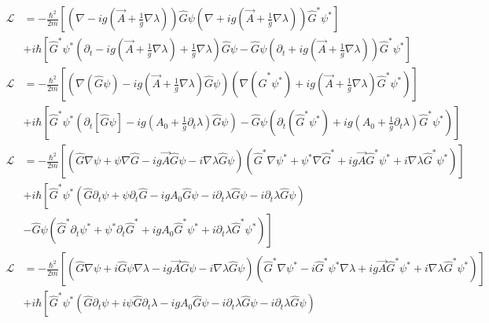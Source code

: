 \begin{align*}
    \mathcal{L}&= -\frac{\hbar^2}{2m}\left[ \left(\nabla - ig\left(\vec{A}+ \frac{1}{g} \nabla \lambda \right)\right)\hat{G}\psi \left( \nabla + ig\left(\vec{A}+ \frac{1}{g} \nabla \lambda \right)\right)\hat{G}^* \psi^*\right] \\
    &+ i\hbar \left[\hat{G}^* \psi^* \left(\partial_t -ig\left(\vec{A}+ \frac{1}{g} \nabla \lambda \right)+ \frac{1}{g} \nabla \lambda\right) \hat{G}\psi - \hat{G}\psi \left(\partial_t +ig\left(\vec{A}+ \frac{1}{g} \nabla \lambda \right)\right) \hat{G}^* \psi^*\right]\\
    \mathcal{L}&= - \frac{\hbar^2}{2m}\left[\left(\nabla \left(\hat{G}\psi\right)-ig \left(\vec{A}+\frac{1}{g}\nabla \lambda \right)\hat{G}\psi \right)\left(\nabla \left(\hat{G}^*\psi^*\right)+ig \left(\vec{A}+\frac{1}{g}\nabla\lambda\right)\hat{G}^*\psi^*\right) \right]\\
    & +i \hbar \left[\hat{G}^* \psi^* \left(\partial_t \left[\hat{G}\psi\right]-ig\left(A_0+\frac{1}{g}\partial_t \lambda\right)\hat{G}\psi \right)- \hat{G}\psi \left(\partial_t \left(\hat{G}^* \psi^* \right)+ig \left(A_0 + \frac{1}{g}\partial_t \lambda\right)\hat{G}^*\psi^*\right) \right]\\
    \mathcal{L}&= -\frac{\hbar^2}{2m} \left[\left(\hat{G}\nabla \psi + \psi \nabla \hat{G}- ig\vec{A}\hat{G}\psi - i \nabla \lambda \hat{G}\psi\right)\left(\hat{G}^*\nabla\psi^* + \psi^* \nabla\hat{G}^* + ig \vec{A}\hat{G}^*\psi^* + i\nabla \lambda \hat{G}^*  \psi^* \right) \right]\\
    &+ i\hbar \left[\hat{G}^* \psi^* \left(\hat{G}\partial_t \psi +\psi \partial_t \hat{G}-igA_0\hat{G}\psi-i\partial_t \lambda \hat{G}\psi -i \partial_t \lambda \hat{G}\psi \right)\right.\\ 
    &\left. -\hat{G}\psi \left(\hat{G}^* \partial_t \psi^* + \psi^* \partial_t \hat{G}^*+ igA_0 \hat{G}^* \psi^* +i\partial_t \lambda \hat{G}^* \psi^*  \right) \right]\\
    \mathcal{L}&= -\frac{\hbar^2}{2m} \left[\left(\hat{G}\nabla \psi + i\hat{G}\psi \nabla \lambda - ig\vec{A}\hat{G}\psi - i \nabla \lambda \hat{G}\psi\right)\left(\hat{G}^*\nabla\psi^* -i\hat{G}^*\psi^* \nabla \lambda + ig \vec{A}\hat{G}^*\psi^* + i\nabla \lambda \hat{G}^*  \psi^* \right) \right]\\
    &+ i\hbar \left[\hat{G}^* \psi^* \left(\hat{G}\partial_t \psi +i\psi \hat{G}\partial_t \lambda -igA_0\hat{G}\psi-i\partial_t \lambda \hat{G}\psi -i \partial_t \lambda \hat{G}\psi \right)\right.\\ 

\end{align*}
